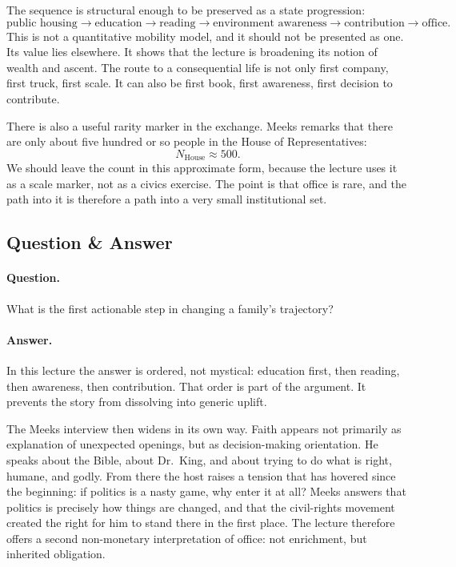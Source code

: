 The sequence is structural enough to be preserved as a state progression:
\begin{equation}
\text{public housing}\to
\text{education}\to
\text{reading}\to
\text{environment awareness}\to
\text{contribution}\to
\text{office}.
\end{equation}
This is not a quantitative mobility model, and it should not be presented as one. Its value lies elsewhere. It shows that the lecture is broadening its notion of wealth and ascent. The route to a consequential life is not only first company, first truck, first scale. It can also be first book, first awareness, first decision to contribute.

There is also a useful rarity marker in the exchange. Meeks remarks that there are only about five hundred or so people in the House of Representatives:
\begin{equation}
N_{\text{House}}\approx 500.
\end{equation}
We should leave the count in this approximate form, because the lecture uses it as a scale marker, not as a civics exercise. The point is that office is rare, and the path into it is therefore a path into a very small institutional set.

\subsection{Question \& Answer}

\paragraph{Question.} What is the first actionable step in changing a family's trajectory?

\paragraph{Answer.} In this lecture the answer is ordered, not mystical: education first, then reading, then awareness, then contribution. That order is part of the argument. It prevents the story from dissolving into generic uplift.

The Meeks interview then widens in its own way. Faith appears not primarily as explanation of unexpected openings, but as decision-making orientation. He speaks about the Bible, about Dr.\ King, and about trying to do what is right, humane, and godly. From there the host raises a tension that has hovered since the beginning: if politics is a nasty game, why enter it at all? Meeks answers that politics is precisely how things are changed, and that the civil-rights movement created the right for him to stand there in the first place. The lecture therefore offers a second non-monetary interpretation of office: not enrichment, but inherited obligation.

